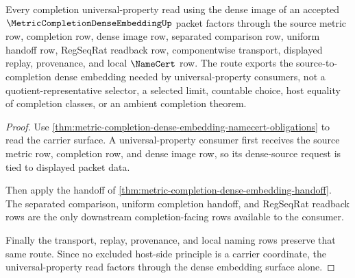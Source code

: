 \begin{theorem}
\label{thm:metric-completion-dense-embedding-universal-property-route}
Every completion universal-property read using the dense image of an accepted $\MetricCompletionDenseEmbeddingUp$ packet factors through the source metric row, completion row, dense image row, separated comparison row, uniform handoff row, RegSeqRat readback row, componentwise transport, displayed replay, provenance, and local $\NameCert$ row. The route exports the source-to-completion dense embedding needed by universal-property consumers, not a quotient-representative selector, a selected limit, countable choice, host equality of completion classes, or an ambient completion theorem.
\end{theorem}
\begin{proof}
Use \autoref{thm:metric-completion-dense-embedding-namecert-obligations} to read the carrier surface. A universal-property consumer first receives the source metric row, completion row, and dense image row, so its dense-source request is tied to displayed packet data.

Then apply the handoff of \autoref{thm:metric-completion-dense-embedding-handoff}. The separated comparison, uniform completion handoff, and RegSeqRat readback rows are the only downstream completion-facing rows available to the consumer.

Finally the transport, replay, provenance, and local naming rows preserve that same route. Since no excluded host-side principle is a carrier coordinate, the universal-property read factors through the dense embedding surface alone.
\end{proof}




